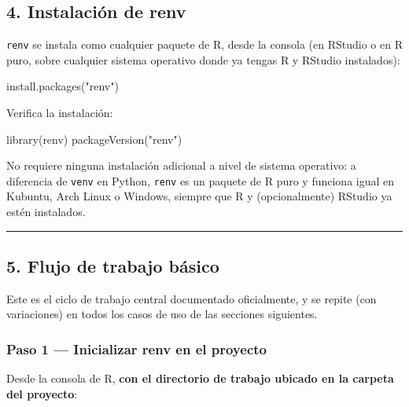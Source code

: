\documentclass[
  man,
  floatsintext,
  longtable,
  a4paper,
  nolmodern,
  notxfonts,
  notimes,
  12pt,
  colorlinks=true,linkcolor=blue,citecolor=blue,urlcolor=blue]{apa7}
\newenvironment{Shaded}{\begin{snugshade}}{\end{snugshade}}
\newcommand{\FunctionTok}[1]{\textcolor[rgb]{0.28,0.35,0.67}{#1}}
\newcommand{\NormalTok}[1]{\textcolor[rgb]{0.00,0.23,0.31}{#1}}
\newcommand{\StringTok}[1]{\textcolor[rgb]{0.13,0.47,0.30}{#1}}
\begin{document}
\subsection{4. Instalación de renv}\label{instalaciuxf3n-de-renv}

\texttt{renv} se instala como cualquier paquete de R, desde la consola
(en RStudio o en R puro, sobre cualquier sistema operativo donde ya
tengas R y RStudio instalados):

\begin{Shaded}
\begin{Highlighting}[]
\FunctionTok{install.packages}\NormalTok{(}\StringTok{"renv"}\NormalTok{)}
\end{Highlighting}
\end{Shaded}

Verifica la instalación:

\begin{Shaded}
\begin{Highlighting}[]
\FunctionTok{library}\NormalTok{(renv)}
\FunctionTok{packageVersion}\NormalTok{(}\StringTok{"renv"}\NormalTok{)}
\end{Highlighting}
\end{Shaded}

No requiere ninguna instalación adicional a nivel de sistema operativo:
a diferencia de \texttt{venv} en Python, \texttt{renv} es un paquete de
R puro y funciona igual en Kubuntu, Arch Linux o Windows, siempre que R
y (opcionalmente) RStudio ya estén instalados.

\begin{center}\rule{0.5\linewidth}{0.5pt}\end{center}

\subsection{5. Flujo de trabajo
básico}\label{flujo-de-trabajo-buxe1sico}

Este es el ciclo de trabajo central documentado oficialmente, y se
repite (con variaciones) en todos los casos de uso de las secciones
siguientes.

\subsubsection{Paso 1 --- Inicializar renv en el
proyecto}\label{paso-1-inicializar-renv-en-el-proyecto}

Desde la consola de R, \textbf{con el directorio de trabajo ubicado en
la carpeta del proyecto}:
\end{document}

